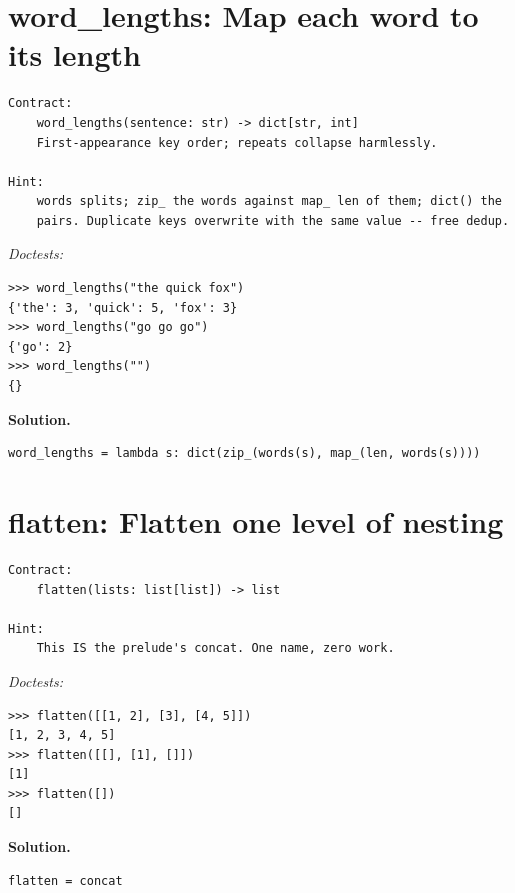 \documentclass[11pt,letterpaper]{book}
\begin{document}
\section{word\_lengths: Map each word to its length}
\begin{lstlisting}[style=spec]
Contract:
    word_lengths(sentence: str) -> dict[str, int]
    First-appearance key order; repeats collapse harmlessly.

Hint:
    words splits; zip_ the words against map_ len of them; dict() the
    pairs. Duplicate keys overwrite with the same value -- free dedup.
\end{lstlisting}
\noindent\textit{Doctests:}
\begin{lstlisting}[style=spec]
>>> word_lengths("the quick fox")
{'the': 3, 'quick': 5, 'fox': 3}
>>> word_lengths("go go go")
{'go': 2}
>>> word_lengths("")
{}
\end{lstlisting}
\noindent\textbf{Solution.}
\begin{lstlisting}[style=code]
word_lengths = lambda s: dict(zip_(words(s), map_(len, words(s))))
\end{lstlisting}

\section{flatten: Flatten one level of nesting}
\begin{lstlisting}[style=spec]
Contract:
    flatten(lists: list[list]) -> list

Hint:
    This IS the prelude's concat. One name, zero work.
\end{lstlisting}
\noindent\textit{Doctests:}
\begin{lstlisting}[style=spec]
>>> flatten([[1, 2], [3], [4, 5]])
[1, 2, 3, 4, 5]
>>> flatten([[], [1], []])
[1]
>>> flatten([])
[]
\end{lstlisting}
\noindent\textbf{Solution.}
\begin{lstlisting}[style=code]
flatten = concat
\end{lstlisting}
\end{document}
